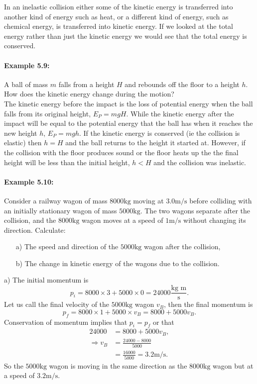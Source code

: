 \documentclass[a4paper,12pt]{book}
\begin{document}
In an inelastic collision either some of the kinetic energy is transferred into another kind of energy such as heat, or a different kind of energy, such as chemical energy, is transferred into kinetic energy. If we looked at the total energy rather than just the kinetic energy we would see that the total energy is conserved.\\

\paragraph{Example 5.9:} A ball of mass $m$ falls from a height $H$ and rebounds off the floor to a height $h$. How does the kinetic energy change during the motion?\\

The kinetic energy before the impact is the loss of potential energy when the ball falls from its original height, $E_{P}=mgH$. While the kinetic energy after the impact will be equal to the potential energy that the ball has when it reaches the new height $h$, $E_{P}=mgh$. If the kinetic energy is conserved (ie the collision is elastic) then $h=H$ and the ball returns to the height it started at. However, if the collision with the floor produces sound or the floor heats up the the final height will be less than the initial height, $h<H$ and the collision was inelastic.

\paragraph{Example 5.10:} Consider a railway wagon of mass $8000\text{kg}$ moving at $3.0\text{m/s}$ before colliding with an initially stationary wagon of mass $5000\text{kg}$. The two wagons separate after the collision, and the $8000\text{kg}$ wagon moves at a speed of $1\text{m/s}$ without changing its direction. Calculate:
\begin{itemize}
\setlength{\itemsep}{-5pt}
    \item[a)] The speed and direction of the $5000\text{kg}$ wagon after the collision,
    \item[b)] The change in kinetic energy of the wagons due to the collision.
\end{itemize} 

a) The initial momentum is 
\begin{equation*}
p_{i}=8000\times 3 +5000\times 0=24 000\frac{\text{kg m}}{\text{s}}.
\end{equation*}
Let us call the final velocity of the $5000\text{kg}$ wagon $v_{B}$, then the final momentum is
\begin{equation*}
p_{f}=8000\times 1 +5000\times v_{B}=8000+5000v_{B}.
\end{equation*}
Conservation of momentum implies that $p_{i}=p_{f}$ or that
\begin{align*}
24 000&=8000+5000v_{B},\\
\Rightarrow v_{B}&=\frac{24000-8000}{5000}\\
&=\frac{16000}{5000}=3.2\text{m/s}.
\end{align*}
So the $5000\text{kg}$ wagon is moving in the same direction as the $8000\text{kg}$ wagon but at a speed of $3.2\text{m/s}$.\\
\end{document}
